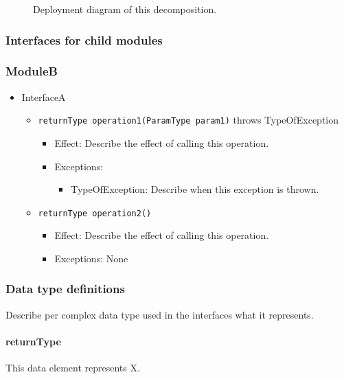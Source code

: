 \documentclass[a4paper,10pt]{article}
\begin{document}
\begin{figure}[!htp]
	\centering
	\caption{Deployment diagram of this decomposition.
	}\label{fig:it1-depl_main}
\end{figure}

\subsubsection{Interfaces for child modules}
\subsubsection*{ModuleB}
\begin{itemize}
	\item InterfaceA
	\begin{itemize}
		\item \texttt{returnType operation1(ParamType param1)} throws TypeOfException
		\begin{itemize}
			\item Effect: Describe the effect of calling this operation.
			\item Exceptions: 
			\begin{itemize}
				\item TypeOfException: Describe when this exception is thrown.
			\end{itemize}
		\end{itemize}
		
		\item \texttt{returnType operation2()}
		\begin{itemize}
			\item Effect: Describe the effect of calling this operation.
			\item Exceptions: None
		\end{itemize}
	\end{itemize}
\end{itemize}

\subsubsection{Data type definitions}
Describe per complex data type used in the interfaces what it represents.

\paragraph{returnType} This data element represents X.
\end{document}
